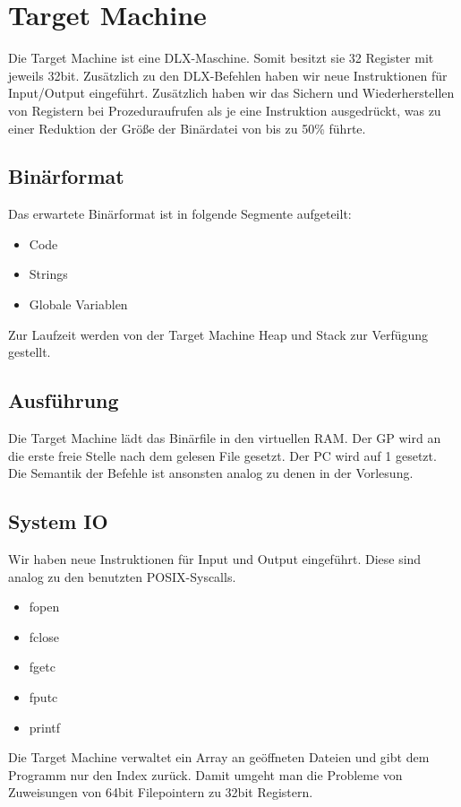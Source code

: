 \documentclass[a4paper,12pt]{article}
\begin{document}
	\section{Target Machine}
	Die Target Machine ist eine DLX-Maschine.
	Somit besitzt sie 32 Register mit jeweils 32bit.
	Zusätzlich zu den DLX-Befehlen haben wir neue Instruktionen für Input/Output eingeführt.
	Zusätzlich haben wir das Sichern und Wiederherstellen von Registern bei Prozeduraufrufen als je eine Instruktion ausgedrückt,
	was zu einer Reduktion der Größe der Binärdatei von bis zu 50\% führte.

	\subsection{Binärformat}
	Das erwartete Binärformat ist in folgende Segmente aufgeteilt:
	\begin{itemize}
		\item Code
		\item Strings
		\item Globale Variablen
	\end{itemize}

	Zur Laufzeit werden von der Target Machine Heap und Stack zur Verfügung gestellt.

	\subsection{Ausführung}
	Die Target Machine lädt das Binärfile in den virtuellen RAM.
	Der GP wird an die erste freie Stelle nach dem gelesen File gesetzt.
	Der PC wird auf 1 gesetzt.
	Die Semantik der Befehle ist ansonsten analog zu denen in der Vorlesung.

	\subsection{System IO}
	Wir haben neue Instruktionen für Input und Output eingeführt.
	Diese sind analog zu den benutzten POSIX-Syscalls.
	\begin{itemize}
		\item fopen
		\item fclose
		\item fgetc
		\item fputc
		\item printf
	\end{itemize}
	Die Target Machine verwaltet ein Array an geöffneten Dateien und gibt dem Programm nur den Index zurück.
	Damit umgeht man die Probleme von Zuweisungen von 64bit Filepointern zu 32bit Registern.
\end{document}
